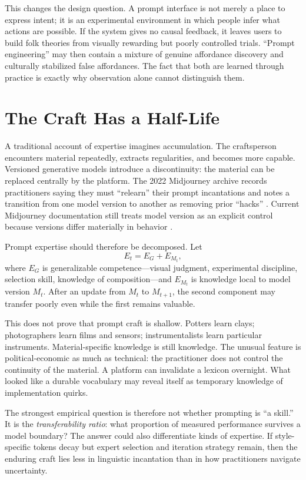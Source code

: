 \documentclass[11pt]{article}
\begin{document}
This changes the design question. A prompt interface is not merely a place to express intent; it is an experimental environment in which people infer what actions are possible. If the system gives no causal feedback, it leaves users to build folk theories from visually rewarding but poorly controlled trials. ``Prompt engineering'' may then contain a mixture of genuine affordance discovery and culturally stabilized false affordances. The fact that both are learned through practice is exactly why observation alone cannot distinguish them.

\section{The Craft Has a Half-Life}

A traditional account of expertise imagines accumulation. The craftsperson encounters material repeatedly, extracts regularities, and becomes more capable. Versioned generative models introduce a discontinuity: the material can be replaced centrally by the platform. The 2022 Midjourney archive records practitioners saying they must ``relearn'' their prompt incantations and notes a transition from one model version to another as removing prior ``hacks'' \parencite{hartsoe2022midjourneyarchive}. Current Midjourney documentation still treats model version as an explicit control because versions differ materially in behavior \parencite{midjourneyVersion}.

Prompt expertise should therefore be decomposed. Let
\[
E_t = E_G + E_{M_t},
\]
where $E_G$ is generalizable competence---visual judgment, experimental discipline, selection skill, knowledge of composition---and $E_{M_t}$ is knowledge local to model version $M_t$. After an update from $M_t$ to $M_{t+1}$, the second component may transfer poorly even while the first remains valuable.

This does not prove that prompt craft is shallow. Potters learn clays; photographers learn films and sensors; instrumentalists learn particular instruments. Material-specific knowledge is still knowledge. The unusual feature is political-economic as much as technical: the practitioner does not control the continuity of the material. A platform can invalidate a lexicon overnight. What looked like a durable vocabulary may reveal itself as temporary knowledge of implementation quirks.

The strongest empirical question is therefore not whether prompting is ``a skill.'' It is the \emph{transferability ratio}: what proportion of measured performance survives a model boundary? The answer could also differentiate kinds of expertise. If style-specific tokens decay but expert selection and iteration strategy remain, then the enduring craft lies less in linguistic incantation than in how practitioners navigate uncertainty.
\end{document}
